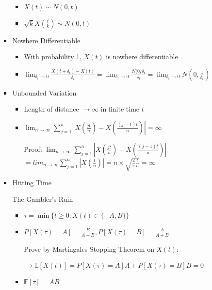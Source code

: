 \documentclass[a4paper]{article}
\begin{document}
\begin{itemize}
\begin{itemize}
\begin{itemize}
\begin{itemize}
                            \item $X(t) \sim N(0, t)$
                            \item $\sqrt{k}X(\frac{t}{k}) \sim N(0, t)$
                        \end{itemize}
                    \item Nowhere Differentiable
                        \begin{itemize}
                            \item With probability 1, $X(t)$ is nowhere differentiable
                            \item $\lim_{\delta_t \rightarrow 0} \frac{X(t+\delta_t) - X(t)}{\delta_t} = \lim_{\delta_t \rightarrow 0} \frac{N(0, \delta_t}{\delta_t} = \lim_{\delta_t \rightarrow 0} N(0, \frac{1}{\delta_t})$
                        \end{itemize}
                    \item Unbounded Variation
                        \begin{itemize}
                            \item Length of distance $\rightarrow \infty$ in finite time $t$
                            \item $\lim_{n \rightarrow \infty} \sum_{j=1}^n |X(\frac{jt}{n}) - X(\frac{(j-1)t}{n})| = \infty$

                                Proof: $\lim_{n \rightarrow \infty} \sum_{j=1}^n |X(\frac{jt}{n}) - X(\frac{(j-1)t}{n})|$
                                $= lim_{n \rightarrow \infty} \sum_{j=1}^n |X(\frac{t}{n})| = n \times \sqrt{\frac{2}{\pi} \frac{t}{n}} = \infty$
                        \end{itemize}
                    \item Hitting Time

                            The Gambler's Ruin
                            \begin{itemize}
                                \item $\tau = \min\{t \geq 0: X(t) \in \{-A, B\}\}$
                                \item $P[X(\tau) = A] = \frac{B}{A+B}, P[X(\tau) = B] = \frac{A}{A+B}$

                                    Prove by Martingales Stopping Theorem on $X(t)$:

                                    $\rightarrow \mathbb{E}[X(t)] = P[X(\tau) = A]A + P[X(\tau) = B]B = 0$
                                \item $\mathbb{E}[\tau] = AB$


\end{itemize}
\end{itemize}
\end{itemize}
\end{itemize}
\end{document}

